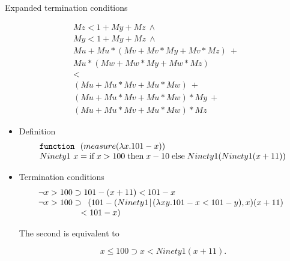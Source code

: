 \begin{slide}
\noindent Expanded termination conditions

\[
\begin{array}{l}
   M z < 1 + M y + M z\ \land \\
   M y < 1 + M y + M z\ \land \\
   M u +  M u * (M v + M v * M y + M v * M z)\ + \\
   M u * (M w + M w * M y + M w * M z) \\
  < \\
  (M u + M u * M v + M u * M w)\ + \\
  (M u + M u * M v + M u * M w) * M y\ + \\
  (M u + M u * M v + M u * M w) * M z
\end{array}
\]

\end{slide}

\begin{slide}

\begin{itemize}
\item Definition 
\[
\begin{array}{l}
\mbox{\tt function}\ \ (measure (\lambda x. 101 - x)) \\
 Ninety1\ x = \mbox{if}\; x>100\; \mbox{then}\;x-10\; \mbox{else}\;
 Ninety1(Ninety1(x+11)) 
\end{array}
\]

\item Termination conditions
\[
\begin{array}{l}
\neg x > 100 \supset 101 - (x + 11) < 101 - x \\
\neg x > 100 \supset 
\begin{array}[t]{l}
     (101 - (Ninety1 \!\mid\! (\lambda x y. 101 - x < 101 - y),x) (x + 11) \\
\hspace{-3mm}  <  101 - x)
\end{array}
\end{array}
\]

The second is equivalent to

\[ x\leq 100 \supset x < Ninety1(x+11). \]

\end{itemize}
\end{slide}

